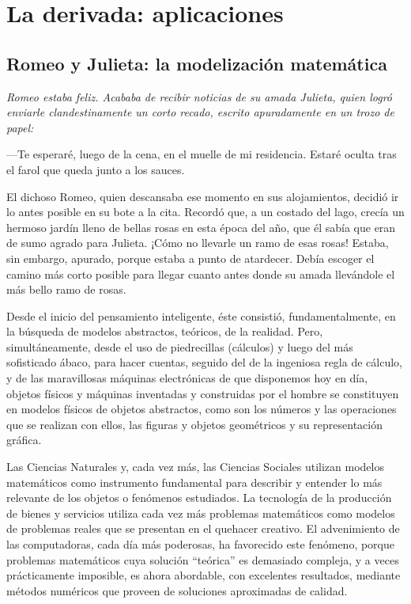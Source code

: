 \chapter{La derivada: aplicaciones}

\section{Romeo y Julieta: la modelización matemática}
\begingroup
\itshape%
Romeo estaba feliz. Acababa de recibir noticias de su amada Julieta, quien logró enviarle
clandestinamente un corto recado, escrito apuradamente en un trozo de papel:

---Te esperaré, luego de la cena, en el muelle de mi residencia. Estaré oculta tras el farol
que queda junto a los sauces.

El dichoso Romeo, quien descansaba ese momento en sus alojamientos, decidió ir lo antes posible en
su bote a la cita. Recordó que, a un costado del lago, crecía un hermoso jardín lleno de bellas
rosas en esta época del año, que él sabía que eran de sumo agrado para Julieta. ¡Cómo no llevarle
un ramo de esas rosas! Estaba, sin embargo, apurado, porque estaba a punto de atardecer. Debía
escoger el camino más corto posible para llegar cuanto antes donde su amada llevándole el más bello
ramo de rosas.
\endgroup

\vspace{\baselineskip}%
Desde el inicio del pensamiento inteligente, éste consistió, fundamentalmente, en la búsqueda de
modelos abstractos, teóricos, de la realidad. Pero, simultáneamente, desde el uso de piedrecillas
(cálculos) y luego del más sofisticado ábaco, para hacer cuentas, seguido del de la ingeniosa regla
de cálculo, y de las maravillosas máquinas electrónicas de que disponemos hoy en día, objetos
físicos y máquinas inventadas y construidas por el hombre se constituyen en modelos físicos de
objetos abstractos, como son los números y las operaciones que se realizan con ellos, las figuras y
objetos geométricos y su representación gráfica.

Las Ciencias Naturales y, cada vez más, las Ciencias Sociales utilizan modelos matemáticos como
instrumento fundamental para describir y entender lo más relevante de los objetos o fenómenos
estudiados. La tecnología de la producción de bienes y servicios utiliza cada vez más problemas
matemáticos como modelos de problemas reales que se presentan en el quehacer creativo. El
advenimiento de las computadoras, cada día más poderosas, ha favorecido este fenómeno, porque
problemas matemáticos cuya solución ``teórica'' es demasiado compleja, y a veces prácticamente
imposible, es ahora abordable, con excelentes resultados, mediante métodos numéricos que proveen de
soluciones aproximadas de calidad.


